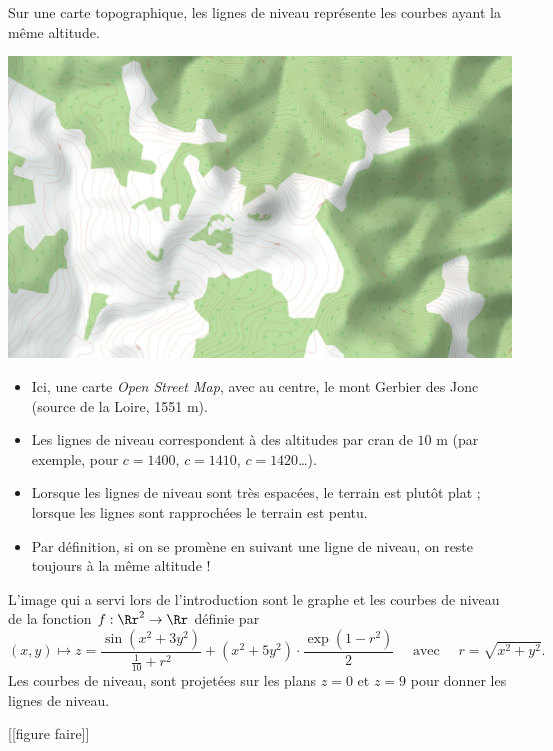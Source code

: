 \documentclass[12pt, class=report,crop=false]{standalone}
\begin{document}
\begin{exemple}
Sur une carte topographique, les lignes de niveau représente les courbes ayant la même altitude. 
\begin{center}
  \includegraphics[scale=0.4]{figures/fig-plusvar-topo}
\end{center}
\begin{itemize}
  \item Ici, une carte \emph{Open Street Map}, avec au centre, le mont Gerbier des Jonc (source de la Loire, 1551 m). 
  \item Les lignes de niveau correspondent à des altitudes par cran de $10$ m (par exemple, pour $c=1400$, $c=1410$, $c=1420$\ldots).
  \item Lorsque les lignes de niveau sont très espacées, le terrain est plutôt plat ; lorsque les lignes sont rapprochées le terrain est pentu.
  \item Par définition, si on se promène en suivant une ligne de niveau, on reste toujours à la même altitude !
\end{itemize}
\end{exemple}


\begin{exemple}
L'image qui a servi lors de l'introduction sont le graphe et les courbes de niveau de la fonction $f : \Rr^2 \to \Rr$ définie par
$$(x,y) \mapsto z = 
\frac{\sin \left( x^{2}+3y^{2} \right)}{\frac{1}{10}+r^{2}}+\left( x^{2}+5y^{2} \right)\cdot \frac{\exp \left( 1-r^{2} \right)}{2} \quad \text{ avec } \quad r=\sqrt{x^{2}+y^{2}}.$$
Les courbes de niveau, sont projetées sur les plans $z=0$ et $z=9$ pour donner les lignes de niveau.


[[figure faire]]

\end{exemple}   
\end{document}
